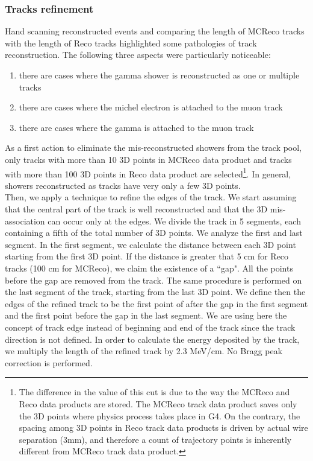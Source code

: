 \documentclass[a4paper, 10pt]{article}
\begin{document}
\subsubsection{Tracks refinement}
\label{trackRef}
Hand scanning reconstructed events and comparing the  length of MCReco tracks with the length of Reco tracks highlighted some pathologies of track reconstruction. The following three aspects were particularly noticeable:
\begin{enumerate}[topsep=10pt,itemsep=-1ex,partopsep=10pt,parsep=1ex]
\item there are cases where the gamma shower is reconstructed as one or multiple tracks
\item there are cases where the michel electron is attached to the muon track
\item there are cases where the gamma is attached to the muon track
\end{enumerate}


As a first action to eliminate the mis-reconstructed showers from the track pool, only tracks with more than 10 3D points in MCReco data product and tracks with more than 100 3D points in Reco data product are selected\footnote{The difference in the value of this cut is due to the way the MCReco and Reco data products are stored. The MCReco track data product saves only the 3D points where physics process takes place in G4. On the contrary, the spacing among 3D points in Reco track data products is driven by actual wire separation (3mm), and therefore a count of trajectory points is inherently different from MCReco track data product.}. In general, showers reconstructed as tracks have very only a few 3D points.  \\
Then, we apply a technique to refine the edges of the track. We start assuming that the central part of the track is well reconstructed and that the 3D mis-association can occur only at the edges. We divide the track in 5 segments, each containing a fifth of the total number of 3D points. We analyze the first and last segment. In the first segment, we calculate the distance between each 3D point starting from the first 3D point. If the distance is greater that 5 cm for Reco tracks (100 cm for MCReco), we claim the existence of a ``gap". All the points before the gap are removed from the track. The same procedure is performed on the last segment of the track, starting from the last 3D point. We define then the edges of the refined track to be the first point of after the gap in the first segment and the first point before the gap in the last segment. We are using here the concept of track edge instead of beginning and end of the track since the track direction is not defined. In order to calculate the energy deposited by the track, we multiply the length of the refined track by 2.3 MeV/cm. No Bragg peak correction is performed.
\end{document}
